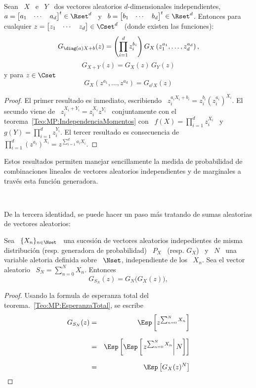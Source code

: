 \begin{teorema}%
\label{Teo:MP:PropiedadesGeneradoraProbabilidad}
%
  Sean  \   $X$  \  e  \   $Y$  \  dos   vectores  aleatorios  $d$-dimensionales
  independientes, $a  = \begin{bmatrix} a_1  & \cdots & a_d  \end{bmatrix}^t \in
  \Rset^d$ \  y \ $b  = \begin{bmatrix} b_1  & \cdots & b_d  \end{bmatrix}^t \in
  \Rset^d$.  Entonces  para  cualquier  $z  = \begin{bmatrix}  z_1  &  \cdots  &
    z_d \end{bmatrix}\in \Cset^d$ \ (donde existen las funciones):
  \[
  G_{\diag(a)  X +  b}(z)  = \left(  \prod_{i=1}^d  z_i^{b_i} \right)  G_X\left(
    z_1^{a_1} , \ldots , z_d^{a_d} \right),
  \]
  \[
  G_{X+Y}(z) = G_X(z) \, G_Y(z)
  \]
  y para $z \in \Cset$
  \[
  G_X\left( z^{a_1} , \ldots , z^{a_d} \right) = G_{a^t X}(z)
  \]
\end{teorema}
%
\begin{proof}
  El  primer  resultado es  inmediato,  escribiendo \  $z_i^{a_i  X_i  + b_i}  =
  z_i^{b_i}   \left(  z_i^{a_i}   \right)^{X_i}$.    El  secundo   viene  de   \
  $z_i^{X_i+Y_i}    =    z_i^{X_i}    z^{Y_i}$    \   conjuntamente    con    el
  teorema~\ref{Teo:MP:IndependenciaMomentos}   con   \   $f(X)  =   \prod_{i=1}^d
  z_i^{X_i}$  \ y \  $g(Y) =  \prod_{i=1}^d z_i^{Y_i}$.  El tercer  resultado es
  consecuencia de $\prod_{i=1}^d  \left( z^{a_i} \right)^{X_i} = z^{\sum_{i=1}^d
    a_i X_i}$.
\end{proof}
%
Estos  resultados permiten manejar  sencillamente la  medida de  probabilidad de
combinaciones lineales  de vectores aleatorios independientes y  de marginales a
trav\'es esta funci\'on generadora.

\

De  la  tercera identidad,  se  puede  hacer un  paso  m\'as  tratando de  sumas
aleatorias de vectores aleatorios:
%
\begin{teorema}\label{Teo:MP:SumaAleatoriaGeneradoraProbabilidad}
%
  Sea  \ $\{  X_n \}_{n  \in \Nset}$  \, una  sucesi\'on de  vectores aleatorios
  indepedientes de  misma distribuci\'on  (resp.  generadora de  probabilidad) \
  $P_X$ \  (resp.  $G_X$) \  y \  $N$ \ una  variable aletoria definida  sobre \
  $\Nset$, independiente  de los  \ $X_n$.  Sea  el vector  aleatorio \ $  S_N =
  \sum_{n=0}^N X_n$. Entonces
  \[
  G_{S_N}(z) =  G_N \big( G_X(z) \big),
  \]
\end{teorema}
%
\begin{proof}
  Usando la formula de esperanza total del teorema.~\ref{Teo:MP:EsperanzaTotal}, se escribe
  \begin{eqnarray*}
  G_{S_N}(z) & = & \Esp\left[ z^{\sum_{n=0}^N X_n} \right]\\[2.5mm]
  & = & \Esp\left[ \Esp\left[ \left. z^{\sum_{n=0}^N X_n} \right| N  \right] \right]\\[2.5mm]
  & = & \Esp\left[ G_X(z)^N \right]
  \end{eqnarray*}
\end{proof}


